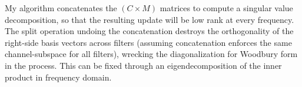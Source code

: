 \documentclass{article}
\begin{document}
My algorithm concatenates the $(C \times M)$ matrices to compute a singular value decomposition, so that the resulting update will be low rank at every frequency. The split operation undoing the concatenation destroys the orthogonality of the right-side basis vectors across filters (assuming concatenation enforces the same channel-subspace for all filters), wrecking the diagonalization for Woodbury form in the process. This can be fixed through an eigendecomposition of the inner product in frequency domain.
\end{document}
